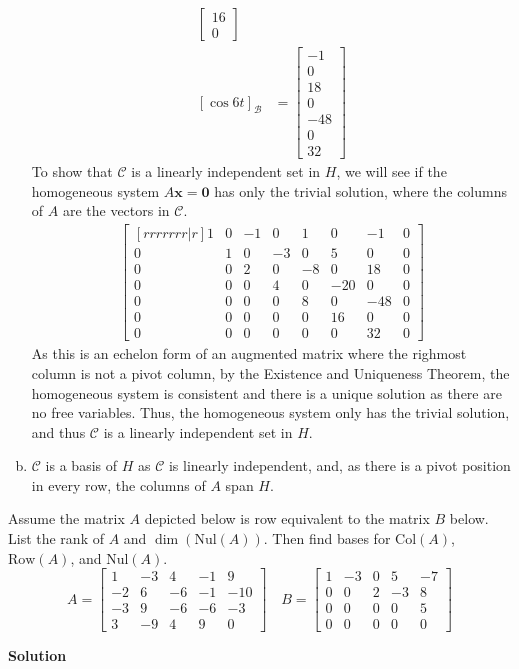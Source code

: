 \documentclass[11pt]{scrartcl}
\theoremstyle{dotlessP}
\theoremstyle{dotlessN}
\newcommand{\nul}{\text{Nul}}
\newcommand{\col}{\text{Col}}
\newcommand{\row}{\text{Row}}
\newcommand{\basis}{\mathcal{B}}
\begin{document}
\begin{enumerate}[a)]
\begin{align*}
\begin{bmatrix}
	16 \\
	0
\end{bmatrix}
			\\
			[\cos 6t]_\basis &= 
			\begin{bmatrix}
				-1 \\
				0 \\
				18 \\
				0 \\
				-48 \\
				0 \\
				32
			\end{bmatrix}
		\end{align*}
		To show that $\mathcal{C}$ is a linearly independent set in $H$, we will see if the homogeneous system $A\bm{x} = \bm{0}$ has only the trivial solution, where the columns of $A$ are the vectors in $\mathcal{C}$.
		\begin{align*}
			\begin{bmatrix}[rrrrrrr|r]
			1 & 0 & -1 & 0 & 1 & 0 & -1 & 0 \\
			0 & 1 & 0 & -3 & 0 & 5 & 0  & 0 \\
			0 & 0 & 2 & 0 & -8 & 0 & 18  & 0 \\
			0 & 0 & 0 & 4 & 0 & -20 & 0 & 0 \\
			0 & 0 & 0 & 0 & 8 & 0 & -48 & 0 \\
			0 & 0 & 0 & 0 & 0 & 16 & 0 & 0 \\
			0 & 0 & 0 & 0 & 0 & 0 & 32 & 0
			\end{bmatrix}
		\end{align*}
		As this is an echelon form of an augmented matrix where the righmost column is not a pivot column, by the Existence and Uniqueness Theorem, the homogeneous system is consistent and there is a unique solution as there are no free variables. Thus, the homogeneous system only has the trivial solution, and thus $\mathcal{C}$ is a linearly independent set in $H$.
	\item $\mathcal{C}$ is a basis of $H$ as $\mathcal{C}$ is linearly independent, and, as there is a pivot position in every row, the columns of $A$ span $H$.
\end{enumerate}
\begin{ques}
	Assume the matrix $A$ depicted below is row equivalent to the matrix $B$ below. List the rank of $A$ and $\dim(\nul(A))$. Then find bases for $\col(A)$, $\row(A)$, and $\nul(A)$.
	\[A =
	\begin{bmatrix}
		1 & -3 & 4 & -1 & 9 \\
		-2 & 6 & -6 & -1 & -10 \\
		-3 & 9 & -6 & -6 & -3 \\
		3 & -9 & 4 & 9 & 0
	\end{bmatrix} \quad
	B =
	\begin{bmatrix}
		1 & -3 & 0 & 5 & -7 \\
		0 & 0 & 2 & -3 & 8 \\
		0 & 0 & 0 & 0 & 5 \\
		0 & 0 & 0 & 0 & 0
	\end{bmatrix}
	\] 
\end{ques}
\textbf{Solution}
\end{document}
